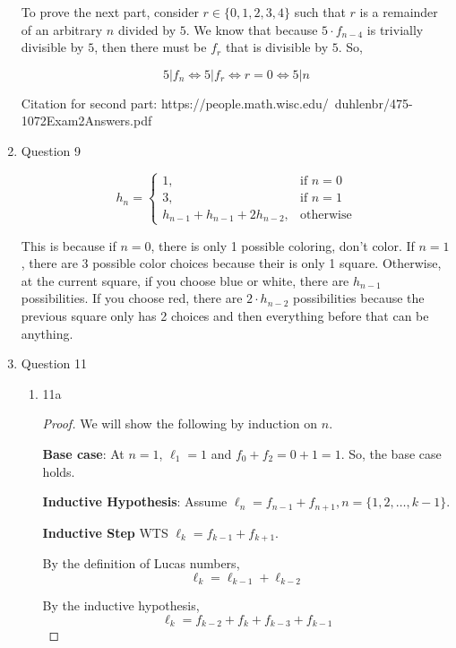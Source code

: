 \documentclass[12pt]{exam}
\begin{document}
\begin{enumerate}
To prove the next part, consider $r \in \{0, 1, 2, 3, 4\}$ such that $r$ is a remainder of an arbitrary $n$ divided by $5$. We know that because $5 \cdot f_{n - 4}$ is trivially divisible by $5$, then there must be $f_r$ that is divisible by $5$. So, 

$$5 | f_n \iff 5 | f_r \iff r = 0 \iff 5 | n$$

Citation for second part: https://people.math.wisc.edu/~duhlenbr/475-1072Exam2Answers.pdf

\item Question 9

\begin{equation}
    h_n = \begin{cases}
    1, & \text{if $n = 0$} \\
    3, & \text{if $n = 1$} \\
    h_{n - 1} + h_{n - 1} + 2h_{n - 2}, & \text{otherwise}
    \end{cases}
\end{equation}

This is because if $n = 0$, there is only 1 possible coloring, don't color. If $n = 1$, there are 3 possible color choices because their is only 1 square. Otherwise, at the current square, if you choose blue or white, there are $h_{n-1}$ possibilities. If you choose red, there are $2\cdot h_{n - 2}$ possibilities because the previous square only has 2 choices and then everything before that can be anything. 

\newpage

\item Question 11

\begin{enumerate}
    \item 11a
    
    \begin{proof} We will show the following by induction on $n$.
    
    \textbf{Base case}: At $n = 1$, $\ell_{1} = 1$ and $f_{0} + f_{2} = 0 + 1 = 1$. So, the base case holds. 
    
    \textbf{Inductive Hypothesis}: Assume $\ell_{n} = f_{n - 1} + f_{n + 1}, n = \{ 1, 2, \dots, k - 1\}$. 
    
    \textbf{Inductive Step} WTS $\ell_{k} = f_{k - 1} + f_{k + 1}$. 
    
    By the definition of Lucas numbers, $$\ell_{k} = \ell_{k - 1} + \ell_{k - 2}$$
    
    By the inductive hypothesis, $$\ell_{k} = f_{k - 2} + f_{k} + f_{k - 3} + f_{k - 1}$$
    

\end{proof}
\end{enumerate}
\end{enumerate}
\end{document}
